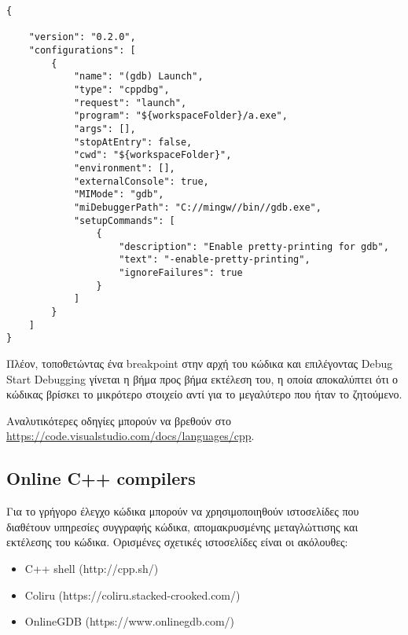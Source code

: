 \begin{enumerate}
\begin{lstlisting}[style=DOS,caption=launch.json]
{

    "version": "0.2.0",
    "configurations": [
        {
            "name": "(gdb) Launch",
            "type": "cppdbg",
            "request": "launch",
            "program": "${workspaceFolder}/a.exe",
            "args": [],
            "stopAtEntry": false,
            "cwd": "${workspaceFolder}",
            "environment": [],
            "externalConsole": true,
            "MIMode": "gdb",
            "miDebuggerPath": "C://mingw//bin//gdb.exe",
            "setupCommands": [
                {
                    "description": "Enable pretty-printing for gdb",
                    "text": "-enable-pretty-printing",
                    "ignoreFailures": true
                }
            ]
        }
    ]
}
\end{lstlisting}

Πλέον, τοποθετώντας ένα breakpoint στην αρχή του κώδικα και επιλέγοντας Debug \textrightarrow Start Debugging γίνεται η βήμα προς βήμα εκτέλεση του, η οποία αποκαλύπτει ότι ο κώδικας βρίσκει το μικρότερο στοιχείο αντί για το μεγαλύτερο που ήταν το ζητούμενο. 

\end{enumerate}

Αναλυτικότερες οδηγίες μπορούν να βρεθούν στο \href{https://code.visualstudio.com/docs/languages/cpp}{https://code.visualstudio.com/docs/languages/cpp}.

%

\subsection*{Online C++ compilers}
Για το γρήγορο έλεγχο κώδικα μπορούν να χρησιμοποιηθούν ιστοσελίδες που διαθέτουν υπηρεσίες συγγραφής κώδικα, απομακρυσμένης μεταγλώττισης και εκτέλεσης του κώδικα. Ορισμένες σχετικές ιστοσελίδες είναι οι ακόλουθες:
\begin{itemize}
\item C++ shell (http://cpp.sh/)
\item Coliru (https://coliru.stacked-crooked.com/)
\item OnlineGDB (https://www.onlinegdb.com/)
\end{itemize}  


